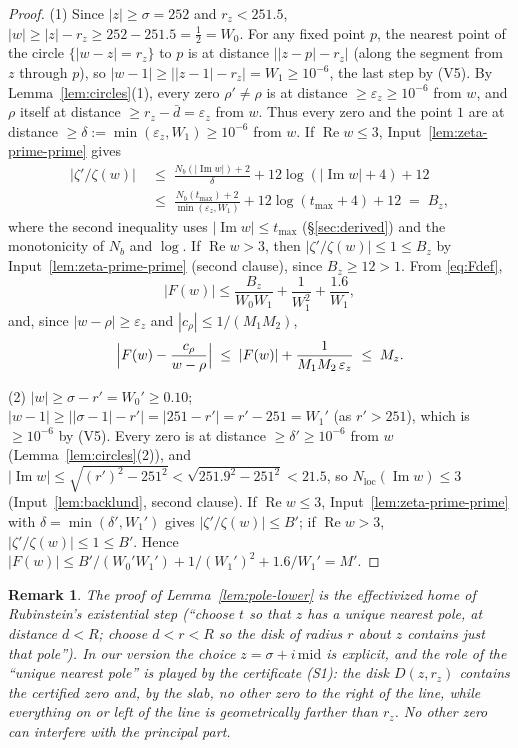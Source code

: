 \documentclass[11pt]{amsart}
\newtheorem{remark}[theorem]{Remark}
\numberwithin{equation}{section}
\newcommand{\re}{\operatorname{Re}}
\newcommand{\im}{\operatorname{Im}}
\newcommand{\Sig}{\sigma}
\newcommand{\dbar}{\bar{d}}
\begin{document}
\begin{proof}
(1) Since $|z| \ge \Sig = 252$ and $r_z < 251.5$,
$|w| \ge |z| - r_z \ge 252 - 251.5 = \tfrac12 = W_0$.
For any fixed point $p$, the nearest point of the circle
$\{|w-z| = r_z\}$ to $p$ is at distance $\bigl||z-p| - r_z\bigr|$
(along the segment from $z$ through $p$), so
$|w-1| \ge \bigl||z-1|-r_z\bigr| = W_1 \ge 10^{-6}$, the last step by
(V5). By Lemma~\ref{lem:circles}(1), every zero $\rho' \ne \rho$ is at
distance $\ge \varepsilon_z \ge 10^{-6}$ from $w$, and $\rho$ itself at
distance $\ge r_z - \dbar = \varepsilon_z$ from $w$. Thus every zero
and the point $1$ are at distance $\ge \delta := \min(\varepsilon_z,
W_1) \ge 10^{-6}$ from $w$. If $\re w \le 3$,
Input~\ref{lem:zeta-prime-prime} gives
\begin{align*}
|\zeta'/\zeta(w)| \;&\le\; \frac{N_b(|\im w|)+2}{\delta}
+ 12\log(|\im w|+4) + 12\\
\;&\le\; \frac{N_b(t_{\max})+2}{\min(\varepsilon_z, W_1)}
+ 12\log(t_{\max}+4) + 12 \;=\; B_z,
\end{align*}
where the second inequality uses $|\im w| \le t_{\max}$
(\S\ref{sec:derived}) and the monotonicity of $N_b$ and $\log$. If
$\re w > 3$, then $|\zeta'/\zeta(w)| \le 1 \le B_z$ by
Input~\ref{lem:zeta-prime-prime} (second clause), since $B_z \ge 12 > 1$.
From \eqref{eq:Fdef},
\[
|F(w)| \le \frac{B_z}{W_0 W_1} + \frac{1}{W_1^2} + \frac{1.6}{W_1},
\]
and, since $|w - \rho| \ge \varepsilon_z$ and
$|c_\rho| \le 1/(M_1M_2)$,
\[
\Bigl|F(w) - \frac{c_\rho}{w-\rho}\Bigr|
\;\le\; |F(w)| + \frac{1}{M_1M_2\,\varepsilon_z} \;\le\; M_z .
\]

(2) $|w| \ge \Sig - r' = W_0' \ge 0.10$; $|w-1| \ge
\bigl||\Sig-1|-r'\bigr| = |251 - r'| = r' - 251 = W_1'$ (as $r' > 251$),
which is $\ge 10^{-6}$ by (V5). Every zero is at distance $\ge \delta' \ge 10^{-6}$ from $w$
(Lemma~\ref{lem:circles}(2)), and $|\im w| \le \sqrt{(r')^2 - 251^2} <
\sqrt{251.9^2 - 251^2} < 21.5$, so $N_{\mathrm{loc}}(\im w) \le 3$
(Input~\ref{lem:backlund}, second clause). If $\re w \le 3$,
Input~\ref{lem:zeta-prime-prime} with $\delta = \min(\delta', W_1')$
gives $|\zeta'/\zeta(w)| \le B'$; if $\re w > 3$,
$|\zeta'/\zeta(w)| \le 1 \le B'$. Hence $|F(w)| \le B'/(W_0'W_1') +
1/(W_1')^2 + 1.6/W_1' = M'$.
\end{proof}

\begin{remark}
The proof of Lemma~\ref{lem:pole-lower} is the effectivized home of
Rubinstein's existential step (``choose $t$ so that $z$ has a unique
nearest pole, at distance $d < R$; choose $d < r < R$ so the disk of
radius $r$ about $z$ contains just that pole''). In our version the
choice $z = \Sig + i\,\mathrm{mid}$ is explicit, and the role of the
``unique nearest pole'' is played by the certificate (S1): the disk
$D(z, r_z)$ contains the certified zero and, by the slab, no other
zero to the right of the line, while everything on or left of the line
is geometrically farther than $r_z$. No other zero can interfere with
the principal part.
\end{remark}
\end{document}
